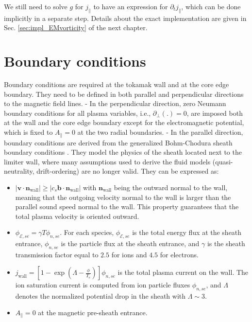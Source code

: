 We still need to solve $g$ for $j_\parallel$ to have an expression for $\partial_t j_\parallel$, which can be done implicitly in a separate step. Details about the exact implementation are given in Sec. \ref{sec:impl_EMvorticity} of the next chapter.





\section{Boundary conditions}
\label{sec:S3X_boundaryConditions}

Boundary conditions are required at the tokamak wall and at the core edge boundary. They need to be defined in both parallel and perpendicular directions to the magnetic field lines. \newline
- In the perpendicular direction, zero Neumann boundary conditions for all plasma variables, i.e., $\partial_{\perp} (.)=0$, are imposed both at the wall and the core edge boundary except for the electromagnetic potential, which is fixed to $A_\parallel=0$ at the two radial boundaries. \newline
- In the parallel direction, boundary conditions are derived from the generalized Bohm-Chodura sheath boundary conditions \cite{Stangeby_2000}. They model the physics of the sheath located next to the limiter wall, where many assumptions used to derive the fluid models (quasi-neutrality, drift-ordering) are no longer valid. They can be expressed as: \newline

\begin{itemize}
	\item $|\boldsymbol{v}\cdot \boldsymbol{n}_\text{wall} | \ge | c_s \boldsymbol{b}\cdot \boldsymbol{n}_\text{wall} |$ with $\boldsymbol{n}_\text{wall}$ being the outward normal to the wall, meaning that the outgoing velocity normal to the wall is larger than the parallel sound speed normal to the wall. This property guarantees that the total plasma velocity is oriented outward.
	\item $\phi_{\mathcal{E},se} =  \gamma T \phi_{n,se}$. For each species, $\phi_{\mathcal{E},se}$ is the total energy flux at the sheath entrance, $\phi_{n,se}$ is the particle flux at the sheath entrance, and $\gamma$ is the sheath transmission factor equal to $2.5$ for ions and $4.5$ for electrons.
	\item $j_\text{wall} = \left[1 - \exp\left( \Lambda - \frac{\phi}{T_e} \right) \right] \phi_{n,se}$ is the total plasma current on the wall. The ion saturation current is computed from ion particle fluxes $\phi_{n,se}$, and $\Lambda$ denotes the normalized potential drop in the sheath with $\Lambda \sim 3$.
	\item $A_{\parallel}=0$ at the magnetic pre-sheath entrance.
\end{itemize}






